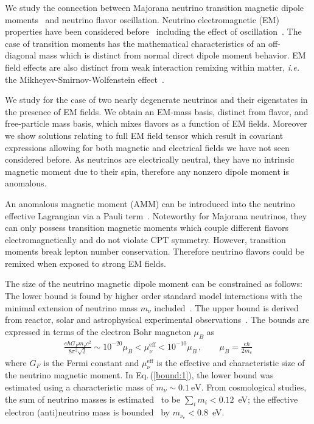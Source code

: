 \documentclass{ws-ijmpa}
\newcommand{\req}[1]{Eq.\,(\ref{#1})}
\begin{document}
We study the connection between Majorana neutrino transition magnetic dipole moments~\cite{Fujikawa:1980yx,Shrock:1980vy,Shrock:1982sc} and neutrino flavor oscillation. Neutrino electromagnetic (EM) properties have been considered before~\cite{Schechter:1981hw,Giunti:2014ixa,Chukhnova:2019oum,Popov:2019nkr} including the effect of oscillation~\cite{Pal:1991pm,Elizalde:2004mw}. The case of transition moments has the mathematical characteristics of an off-diagonal mass which is distinct from normal direct dipole moment behavior. EM field effects are also distinct from weak interaction remixing within matter, {\it i.e.\/} the Mikheyev-Smirnov-Wolfenstein effect~\cite{Wolfenstein:1977ue,Mikheyev:1985zog,Smirnov:2003da}.

We study for the case of two nearly degenerate neutrinos and their eigenstates in the presence of EM fields. We obtain an EM-mass basis, distinct from flavor, and free-particle mass basis, which mixes flavors as a function of EM fields. Moreover we show solutions relating to full EM field tensor which result in covariant expressions allowing for both magnetic and electrical fields we have not seen considered before. As neutrinos are electrically neutral, they have no intrinsic magnetic moment due to their spin, therefore any nonzero dipole moment is anomalous.

An anomalous magnetic moment (AMM) can be introduced into the neutrino effective Lagrangian via a Pauli term~\cite{Steinmetz:2018ryf,Itzykson:1980rh,Schwartz:2014sze}. Noteworthy for Majorana neutrinos, they can only possess transition magnetic moments which couple different flavors electromagnetically and do not violate CPT symmetry. However, transition moments break lepton number conservation. Therefore neutrino flavors could be remixed when exposed to strong EM fields.

The size of the neutrino magnetic dipole moment can be constrained as follows: The lower bound is found by higher order standard model interactions with the minimal extension of neutrino mass $m_{\nu}$ included~\cite{Fujikawa:1980yx,Shrock:1980vy,Shrock:1982sc}. The upper bound is derived from reactor, solar and astrophysical experimental observations~\cite{Giunti:2015gga,Canas:2015yoa,Studenikin:2016ykv,AristizabalSierra:2021fuc}. The bounds are expressed in terms of the electron Bohr magneton $\mu_{B}$ as
\begin{align}
\label{bound:1}
\frac{e\hbar G_{F}m_{\nu}c^{2}}{8\pi^{2}\sqrt{2}} \sim 10^{-20}\mu_{B}<\mu_{\nu}^\mathrm{eff}<10^{-10}\mu_{B}\,,\qquad\mu_{B}=\frac{e\hbar}{2m_{e}}
\end{align}
where $G_{F}$ is the Fermi constant and $\mu_{\nu}^\mathrm{eff}$ is the effective and characteristic size of the neutrino magnetic moment. In \req{bound:1}, the lower bound was estimated using a characteristic mass of $m_{\nu}\sim0.1~\mathrm{eV}$. From cosmological studies, the sum of neutrino masses is estimated~\cite{Planck:2018vyg} to be $\sum_{i}m_{i}<0.12$~eV; the effective electron (anti)neutrino mass is bounded~\cite{KATRIN:2021uub} by $m_{\nu_{e}}<0.8$~eV.
\end{document}
